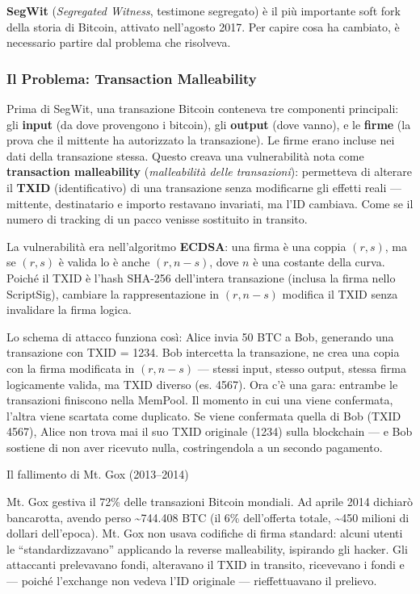 \documentclass[
  italian,
  openany]{book}
\begin{document}
\textbf{SegWit} (\emph{Segregated Witness}, testimone segregato) è il
più importante soft fork della storia di Bitcoin, attivato nell'agosto
2017. Per capire cosa ha cambiato, è necessario partire dal problema che
risolveva.

\subsubsection{Il Problema: Transaction
Malleability}\label{il-problema-transaction-malleability}

Prima di SegWit, una transazione Bitcoin conteneva tre componenti
principali: gli \textbf{input} (da dove provengono i bitcoin), gli
\textbf{output} (dove vanno), e le \textbf{firme} (la prova che il
mittente ha autorizzato la transazione). Le firme erano incluse nei dati
della transazione stessa. Questo creava una vulnerabilità nota come
\textbf{transaction malleability} (\emph{malleabilità delle
transazioni}): permetteva di alterare il \textbf{TXID} (identificativo)
di una transazione senza modificarne gli effetti reali --- mittente,
destinatario e importo restavano invariati, ma l'ID cambiava. Come se il
numero di tracking di un pacco venisse sostituito in transito.

La vulnerabilità era nell'algoritmo \textbf{ECDSA}: una firma è una
coppia \((r, s)\), ma se \((r, s)\) è valida lo è anche \((r, n-s)\),
dove \(n\) è una costante della curva. Poiché il TXID è l'hash SHA-256
dell'intera transazione (inclusa la firma nello ScriptSig), cambiare la
rappresentazione in \((r, n-s)\) modifica il TXID senza invalidare la
firma logica.

Lo schema di attacco funziona così: Alice invia 50 BTC a Bob, generando
una transazione con TXID = 1234. Bob intercetta la transazione, ne crea
una copia con la firma modificata in \((r, n-s)\) --- stessi input,
stesso output, stessa firma logicamente valida, ma TXID diverso (es.
4567). Ora c'è una gara: entrambe le transazioni finiscono nella
MemPool. Il momento in cui una viene confermata, l'altra viene scartata
come duplicato. Se viene confermata quella di Bob (TXID 4567), Alice non
trova mai il suo TXID originale (1234) sulla blockchain --- e Bob
sostiene di non aver ricevuto nulla, costringendola a un secondo
pagamento.

\begin{calloutnote}{Il fallimento di Mt. Gox (2013–2014)}

Mt. Gox gestiva il 72\% delle transazioni Bitcoin mondiali. Ad aprile
2014 dichiarò bancarotta, avendo perso \textasciitilde744.408 BTC (il
6\% dell'offerta totale, \textasciitilde450 milioni di dollari
dell'epoca). Mt. Gox non usava codifiche di firma standard: alcuni
utenti le ``standardizzavano'' applicando la reverse malleability,
ispirando gli hacker. Gli attaccanti prelevavano fondi, alteravano il
TXID in transito, ricevevano i fondi e --- poiché l'exchange non vedeva
l'ID originale --- rieffettuavano il prelievo.

\end{calloutnote}
\end{document}
